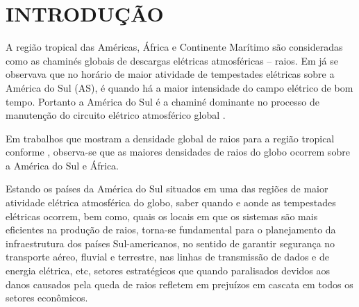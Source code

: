 \chapter{INTRODUÇÃO}

A região tropical das Américas, África e Continente Marítimo são consideradas como as chaminés globais de descargas elétricas atmosféricas -- raios. Em  já se observava que no horário de maior atividade de tempestades elétricas sobre a América do Sul (AS), é quando há a maior intensidade do campo elétrico de bom tempo. Portanto a América do Sul é a chaminé dominante no processo de manutenção do circuito elétrico atmosférico global \cite{williams2004}.




Em trabalhos que mostram a densidade global de raios para a região tropical conforme , observa-se que as maiores densidades de raios do globo ocorrem sobre a América do Sul e África.

Estando os países da América do Sul situados em uma das regiões de maior atividade elétrica atmosférica do globo, saber quando e aonde as tempestades elétricas ocorrem, bem como, quais os locais em que os sistemas são mais eficientes na produção de raios, torna-se fundamental para o planejamento da infraestrutura dos países Sul-americanos, no sentido de garantir segurança no transporte aéreo, fluvial e terrestre, nas linhas de transmissão de dados e de energia elétrica, etc, setores estratégicos que quando paralisados devidos aos danos causados pela queda de raios refletem em prejuízos em cascata em todos os setores econômicos. 

